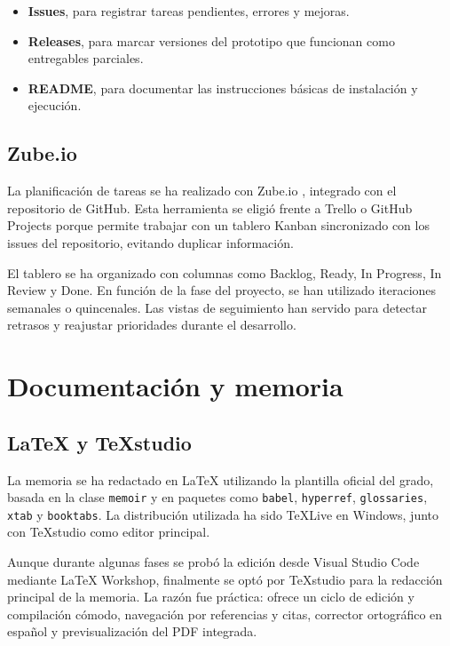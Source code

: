 \begin{itemize}
	\item \textbf{Issues}, para registrar tareas pendientes, errores y mejoras.
	
	\item \textbf{Releases}, para marcar versiones del prototipo que funcionan como entregables parciales.
	
	\item \textbf{README}, para documentar las instrucciones básicas de instalación y ejecución.
\end{itemize}

\subsection{Zube.io}

La planificación de tareas se ha realizado con Zube.io \cite{zube_official}, integrado con el repositorio de GitHub. Esta herramienta se eligió frente a Trello o GitHub Projects porque permite trabajar con un tablero Kanban sincronizado con los issues del repositorio, evitando duplicar información.

El tablero se ha organizado con columnas como Backlog, Ready, In Progress, In Review y Done. En función de la fase del proyecto, se han utilizado iteraciones semanales o quincenales. Las vistas de seguimiento han servido para detectar retrasos y reajustar prioridades durante el desarrollo.

\section{Documentación y memoria}

\subsection{\LaTeX{} y TeXstudio}

La memoria se ha redactado en \LaTeX{} utilizando la plantilla oficial del grado, basada en la clase \texttt{memoir} y en paquetes como \texttt{babel}, \texttt{hyperref}, \texttt{glossaries}, \texttt{xtab} y \texttt{booktabs}. La distribución utilizada ha sido \TeX Live{} en Windows, junto con TeXstudio como editor principal.

Aunque durante algunas fases se probó la edición desde Visual Studio Code mediante LaTeX Workshop, finalmente se optó por TeXstudio para la redacción principal de la memoria. La razón fue práctica: ofrece un ciclo de edición y compilación cómodo, navegación por referencias y citas, corrector ortográfico en español y previsualización del PDF integrada.

